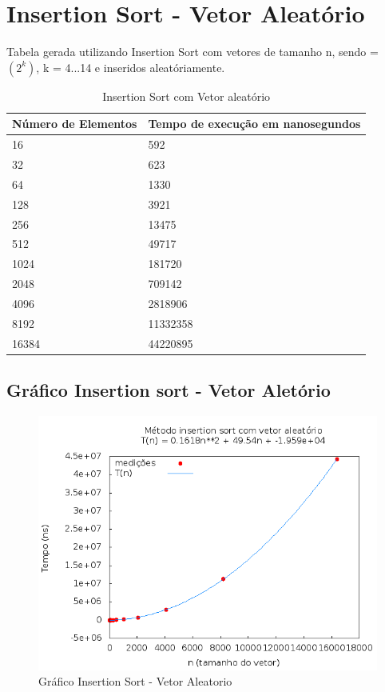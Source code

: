 \documentclass[12pt,a4paper,twoside]{report}
\begin{document}
\section{Insertion Sort - Vetor Aleatório}
Tabela gerada utilizando Insertion Sort com vetores de tamanho n, sendo = $(2^k)$, k = 4...14 e inseridos aleatóriamente.
\begin{table}[H]
\centering
\caption{Insertion Sort com Vetor aleatório}
\begin{tabular}{|l|l|}
\hline
\multicolumn{1}{|c|}{\textbf{Número de Elementos}} & \multicolumn{1}{c|}{\textbf{Tempo de execução em nanosegundos}} \\ \hline
16 & 592 \\ \hline
32 & 623 \\ \hline
64 & 1330 \\ \hline
128 & 3921 \\ \hline
256 & 13475 \\ \hline
512 & 49717 \\ \hline
1024 & 181720 \\ \hline
2048 & 709142 \\ \hline
4096 & 2818906 \\ \hline
8192 & 11332358 \\ \hline
16384 & 44220895 \\ \hline
\end{tabular}
\end{table}


\subsection{Gráfico Insertion sort - Vetor Aletório}
\begin{figure}[H]
    \centering
    \includegraphics[width=0.7\linewidth]{graficos/Insertion/vIntAleatorio/vIntAleatorio.png}
  \caption{Gráfico Insertion Sort - Vetor Aleatorio}
\end{figure}
\end{document}
